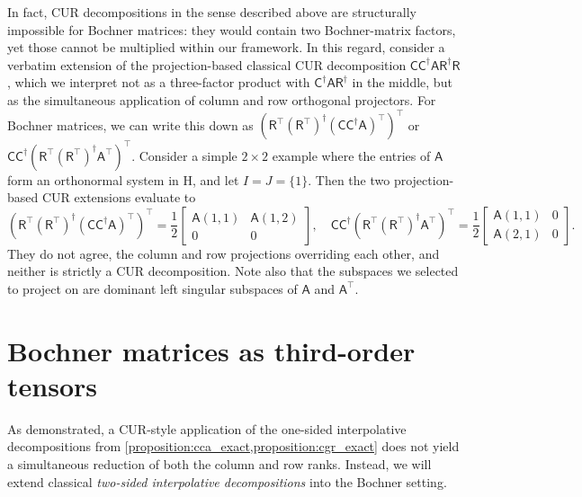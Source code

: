 \documentclass[onefignum,onetabnum]{siamart250211}
\renewenvironment{equation*}{\[}{\]\ignorespacesafterend}
\newcommand{\Hilb}{\mathrm{H}}
\newcommand{\Batrix}[1]{\bm{\Matrix{#1}}}
\newcommand{\Matrix}[1]{\mathsf{#1}}
\newcommand{\trans}{\intercal}
\newcommand{\pinv}{\dagger}
\newcommand{\Index}[1]{{#1}}
\begin{document}
In fact, CUR decompositions in the sense described above are structurally impossible for Bochner matrices: they would contain two Bochner-matrix factors, yet those cannot be multiplied within our framework.
In this regard, consider a verbatim extension of the projection-based classical CUR decomposition $\Matrix{C} \Matrix{C}^{\pinv} \Matrix{A} \Matrix{R}^{\pinv} \Matrix{R}$ \cite{mahoney2009cur}, which we interpret not as a three-factor product with $\Matrix{C}^{\pinv} \Matrix{A} \Matrix{R}^{\pinv}$ in the middle, but as the simultaneous application of column and row orthogonal projectors.
For Bochner matrices, we can write this down as $(\Batrix{R}^\trans (\Batrix{R}^\trans)^\pinv (\Batrix{C} \Batrix{C}^\pinv \Batrix{A})^\trans)^\trans$ or $\Batrix{C} \Batrix{C}^\pinv (\Batrix{R}^\trans (\Batrix{R}^\trans)^\pinv \Batrix{A}^\trans)^\trans$.
Consider a simple $2 \times 2$ example where the entries of $\Batrix{A}$ form an orthonormal system in $\Hilb$, and let $\Index{I} = \Index{J} = \{ 1 \}$.
Then the two projection-based CUR extensions evaluate to
\begin{equation*}
    (\Batrix{R}^\trans (\Batrix{R}^\trans)^\pinv (\Batrix{C} \Batrix{C}^\pinv \Batrix{A})^\trans)^\trans = \frac{1}{2} \begin{bmatrix}
        \Batrix{A}(1,1) & \Batrix{A}(1,2) \\
        0 & 0
    \end{bmatrix}, \quad
    \Batrix{C} \Batrix{C}^\pinv (\Batrix{R}^\trans (\Batrix{R}^\trans)^\pinv \Batrix{A}^\trans)^\trans = \frac{1}{2} \begin{bmatrix}
        \Batrix{A}(1,1) & 0 \\
        \Batrix{A}(2,1) & 0
    \end{bmatrix}.
\end{equation*}
They do not agree, the column and row projections overriding each other, and neither is strictly a CUR decomposition.
Note also that the subspaces we selected to project on are dominant left singular subspaces of $\Batrix{A}$ and $\Batrix{A}^\trans$.
\section{Bochner matrices as third-order tensors}
\label{sec:bmx_3t}
As demonstrated, a CUR-style application of the one-sided interpolative decompositions from \cref{proposition:cca_exact,proposition:cgr_exact} does not yield a simultaneous reduction of both the column and row ranks.
Instead, we will extend classical \emph{two-sided interpolative decompositions} \cite{voronin2017efficient} into the Bochner setting.
\end{document}
